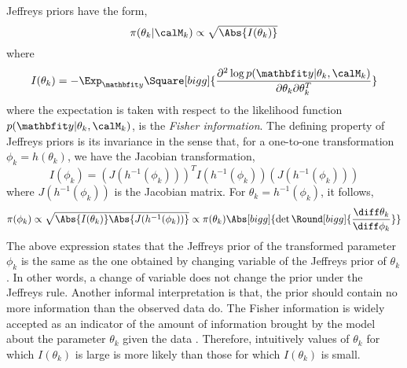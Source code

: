 Jeffreys priors \cite{Jeffreys:1946jf} have the form,
\begin{equation}
  \pi(\theta_k|\calM_k)\propto\sqrt{\Abs{I(\theta_k)}}
\end{equation}
where
\begin{equation}
  I(\theta_k)
  = -\Exp_{\data}\Square[bigg]{\frac{\partial^2\log p(\data|\theta_k,\calM_k)}
    {\partial\theta_k\partial\theta_k^T}}
\end{equation}
where the expectation is taken with respect to the likelihood function
$p(\data|\theta_k,\calM_k)$, is the \emph{Fisher information}. The defining
property of Jeffreys priors is its invariance in the sense that, for a
one-to-one transformation $\phi_k = h(\theta_k)$, we have the Jacobian
transformation,
\begin{equation*}
  I(\phi_k) = (J(h^{-1}(\phi_k)))^T I(h^{-1}(\phi_k)) 
  (J(h^{-1}(\phi_k)))
\end{equation*}
where $J(h^{-1}(\phi_k))$ is the Jacobian matrix. For $\theta_k =
h^{-1}(\phi_k)$, it follows,
\begin{equation*}
  \pi(\phi_k)
  \propto \sqrt{\Abs{I(\theta_k)}\Abs{J(h^{-1}(\phi_k))}}
  \propto \pi(\theta_k)
  \Abs[bigg]{\det\Round[bigg]{\frac{\diff\theta_k}{\diff\phi_k}}}
\end{equation*}
The above expression states that the Jeffreys prior of the transformed
parameter $\phi_k$ is the same as the one obtained by changing variable of
the Jeffreys prior of $\theta_k$. In other words, a change of variable does
not change the prior under the Jeffreys rule. Another informal interpretation
is that, the prior should contain no more information than the observed data
do. The Fisher information is widely accepted as an indicator of the amount
of information brought by the model about the parameter $\theta_k$ given the
data \cite{Fisher:1956vx}. Therefore, intuitively values of $\theta_k$ for
which $I(\theta_k)$ is large is more likely than those for which
$I(\theta_k)$ is small.


